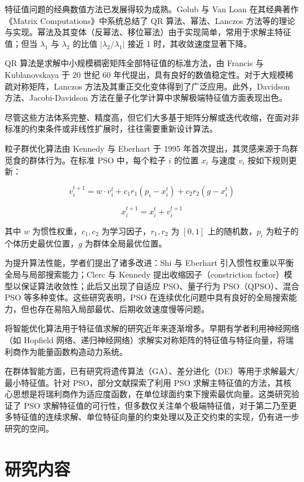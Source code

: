 特征值问题的经典数值方法已发展得较为成熟。Golub 与 Van Loan 在其经典著作《Matrix Computations》中系统总结了 QR 算法、幂法、Lanczos 方法等的理论与实现。幂法及其变体（反幂法、移位幂法）由于实现简单，常用于求解主特征值；但当 $\lambda_1$ 与 $\lambda_2$ 的比值 $|\lambda_2 / \lambda_1|$ 接近 1 时，其收敛速度显著下降。

QR 算法是求解中小规模稠密矩阵全部特征值的标准方法，由 Francis 与 Kublanovskaya 于 20 世纪 60 年代提出，具有良好的数值稳定性。对于大规模稀疏对称矩阵，Lanczos 方法及其重正交化变体得到了广泛应用。此外，Davidson 方法、Jacobi-Davidson 方法在量子化学计算中求解极端特征值方面表现出色。

尽管这些方法体系完整、精度高，但它们大多基于矩阵分解或迭代收缩，在面对非标准的约束条件或非线性扩展时，往往需要重新设计算法。

粒子群优化算法由 Kennedy 与 Eberhart 于 1995 年首次提出，其灵感来源于鸟群觅食的群体行为。在标准 PSO 中，每个粒子 $i$ 的位置 $x_i$ 与速度 $v_i$ 按如下规则更新：

\begin{equation}
 v_i^{t+1} = w \cdot v_i^t + c_1 r_1 (p_i - x_i^t) + c_2 r_2 (g - x_i^t)   
\end{equation}
 

$$
x_i^{t+1} = x_i^t + v_i^{t+1}
$$

其中 $w$ 为惯性权重，$c_1, c_2$ 为学习因子，$r_1, r_2$ 为 $[0,1]$ 上的随机数，$p_i$ 为粒子的个体历史最优位置，$g$ 为群体全局最优位置。

为提升算法性能，学者们提出了诸多改进：Shi 与 Eberhart 引入惯性权重以平衡全局与局部搜索能力；Clerc 与 Kennedy 提出收缩因子（constriction factor）模型以保证算法收敛性；此后又出现了自适应 PSO、量子行为 PSO（QPSO）、混合 PSO 等多种变体。这些研究表明，PSO 在连续优化问题中具有良好的全局搜索能力，但也存在易陷入局部最优、后期收敛速度慢等问题。


将智能优化算法用于特征值求解的研究近年来逐渐增多。早期有学者利用神经网络（如 Hopfield 网络、递归神经网络）求解实对称矩阵的特征值与特征向量，将瑞利商作为能量函数构造动力系统。

在群体智能方面，已有研究将遗传算法（GA）、差分进化（DE）等用于求解最大/最小特征值。针对 PSO，部分文献探索了利用 PSO 求解主特征值的方法，其核心思想是将瑞利商作为适应度函数，在单位球面约束下搜索最优向量。这类研究验证了 PSO 求解特征值的可行性，但多数仅关注单个极端特征值，对于第二乃至更多特征值的连续求解、单位特征向量的约束处理以及正交约束的实现，仍有进一步研究的空间。


\section{研究内容}

